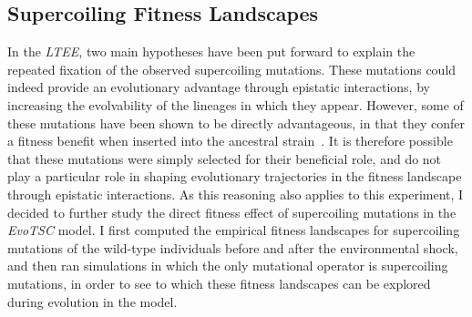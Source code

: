\subsection{Supercoiling Fitness Landscapes}

In the \emph{LTEE}, two main hypotheses have been put forward to explain the repeated fixation of the observed supercoiling mutations.
These mutations could indeed provide an evolutionary advantage through epistatic interactions, by increasing the evolvability of the lineages in which they appear.
However, some of these mutations have been shown to be directly advantageous, in that they confer a fitness benefit when inserted into the ancestral strain~\citep{crozat2005}.
It is therefore possible that these mutations were simply selected for their beneficial role, and do not play a particular role in shaping evolutionary trajectories in the fitness landscape through epistatic interactions.
As this reasoning also applies to this experiment, I decided to further study the direct fitness effect of supercoiling mutations in the \emph{EvoTSC} model.
I first computed the empirical fitness landscapes for supercoiling mutations of the wild-type individuals before and after the environmental shock, and then ran simulations in which the only mutational operator is supercoiling mutations, in order to see to which these fitness landscapes can be explored during evolution in the model.

